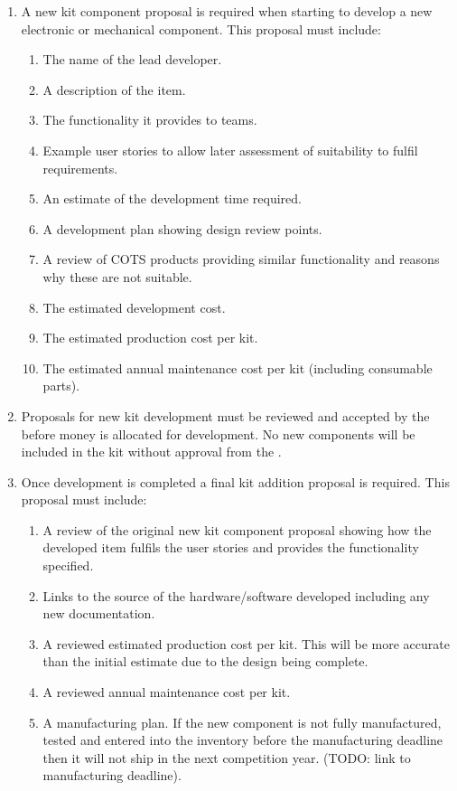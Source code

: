 \begin{enumerate}
\begin{enumerate}
\begin{enumerate}
        \item A new kit component proposal is required when starting to develop a new electronic or mechanical component. This proposal must include:
          \begin{enumerate}
            \item The name of the lead developer.
            \item A description of the item.
            \item The functionality it provides to teams.
            \item Example user stories to allow later assessment of suitability to fulfil requirements.
            \item An estimate of the development time required.
            \item A development plan showing design review points.
            \item A review of COTS products providing similar functionality and reasons why these are not suitable.
            \item The estimated development cost.
            \item The estimated production cost per kit.
            \item The estimated annual maintenance cost per kit (including consumable parts).
          \end{enumerate}
        \item Proposals for new kit development must be reviewed and accepted by the  before money is allocated for development. No new components will be included in the kit without approval from the .
        \item Once development is completed a final kit addition proposal is required. This proposal must include:
          \begin{enumerate}
            \item A review of the original new kit component proposal showing how the developed item fulfils the user stories and provides the functionality specified.
            \item Links to the source of the hardware/software developed including any new documentation.
            \item A reviewed estimated production cost per kit. This will be more accurate than the initial estimate due to the design being complete.
            \item A reviewed annual maintenance cost per kit.
            \item A manufacturing plan. If the new component is not fully manufactured, tested and entered into the inventory before the manufacturing deadline then it will not ship in the next competition year. (TODO: link to manufacturing deadline).

\end{enumerate}
\end{enumerate}
\end{enumerate}
\end{enumerate}
